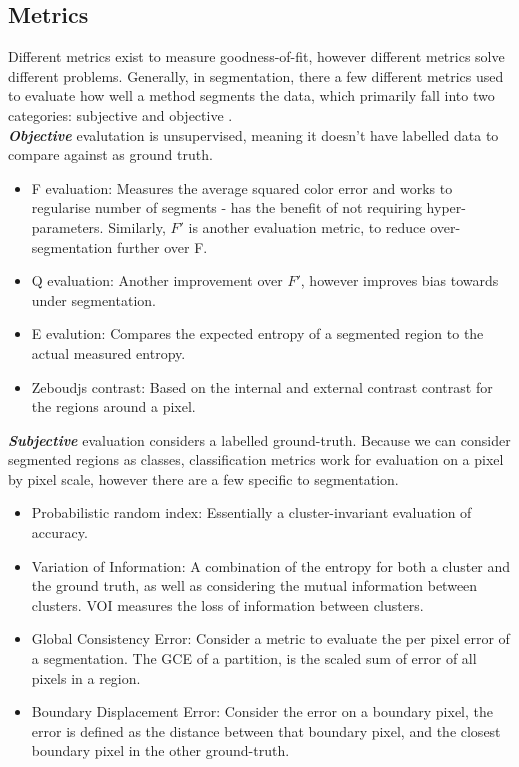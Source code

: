 \documentclass[a4]{article}
\begin{document}

\subsection*{Metrics}

Different metrics exist to measure goodness-of-fit, however different metrics solve different problems. Generally, in segmentation, there a few different metrics used to evaluate how well a method segments the data, which primarily fall into two categories: subjective and objective \cite{garcia2018segmentation}.\\

\textbf{\textit{Objective}} evalutation is unsupervised, meaning it doesn't have labelled data to compare against as ground truth.

\begin{itemize}
\item F evaluation: Measures the average squared color error and works to regularise number of segments - has the benefit of not requiring hyper-parameters. Similarly, $F'$ is another evaluation metric, to reduce over-segmentation further over F.
\item Q evaluation: Another improvement over $F'$, however improves bias towards under segmentation.
\item E evalution: Compares the expected entropy of a segmented region to the actual measured entropy.
\item Zeboudjs contrast: Based on the internal and external contrast contrast for the regions around a pixel.
\end{itemize}


\textbf{\textit{Subjective}} evaluation considers a labelled ground-truth. Because we can consider segmented regions as classes, classification metrics work for evaluation on a pixel by pixel scale, however there are a few specific to segmentation.
\begin{itemize}
\item Probabilistic random index: Essentially a cluster-invariant evaluation of accuracy.
\item  Variation of Information: A combination of the entropy for both a cluster and the ground truth, as well as considering the mutual information between clusters. VOI measures the loss of information between clusters.
\item Global Consistency Error: Consider a metric to evaluate the per pixel error of a segmentation. The GCE of a partition, is the scaled sum of error of all pixels in a region.
\item Boundary Displacement Error: Consider the error on a boundary pixel, the error is defined as the distance between that boundary pixel, and the closest boundary pixel in the other ground-truth.
\end{itemize}



\end{document}

